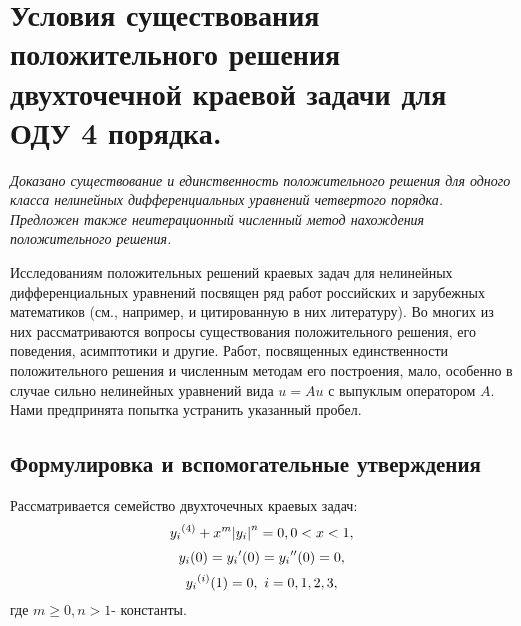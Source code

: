 \section{Условия существования положительного решения двухточечной краевой задачи для ОДУ 4 порядка.}


\textit{ Доказано существование и единственность положительного решения для одного
класса нелинейных дифференциальных уравнений четвертого порядка. Предложен
также неитерационный численный метод нахождения положительного решения.
}



Исследованиям положительных решений краевых задач для нелинейных
дифференциальных уравнений посвящен ряд работ российских и зарубежных
математиков (см., например, \cite{krasnosel, pohojOvs, pohojVariaz, gidasSpruck, kuoShung, galahov, gaponenko} и цитированную в них литературу). Во многих из
них рассматриваются вопросы существования положительного решения, его поведения,
асимптотики и другие. Работ, посвященных  единственности положительного решения
и численным методам его построения, мало, особенно в случае сильно нелинейных
уравнений вида $ u=Au $ с выпуклым оператором $ A.$  Нами предпринята попытка
устранить указанный пробел.

\subsection{Формулировка и вспомогательные утверждения}

Рассматривается семейство двухточечных краевых задач:
\begin{equation}\label{eq.1.3.2.1_{i}}
{y_{i}}^{(4)}+x^m{\vert y_{i}\vert}^n=0, 0<x<1,
\end{equation}
\begin{equation}\label{eq.1.3.2.2_{i}}
y_{i}(0)={y_{i}}^{\prime}(0)={y_{i}}^{\prime\prime}(0)=0,
\end{equation}
\begin{equation}\label{eq.1.3.2.3_{i}}
{y_{i}}^{(i)}(1)=0,\ i=0,1,2,3,
\end{equation}
где $m\geq 0, n>1$- константы.

